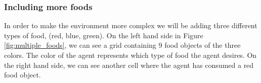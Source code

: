 \documentclass[12pt,A4]{report}
\theoremstyle{definition}
\begin{document}

\subsubsection{Including more foods}
In order to make the environment more complex we will be adding three different types of food, (red, blue, green). On the left hand side in Figure \ref{fig:multiple_foods}, we can see a grid containing 9 food objects of the three colors. The color of the agent represents which type of food the agent desires. On the right hand side, we can see another cell where the agent has consumed a red food object. 
\end{document}
